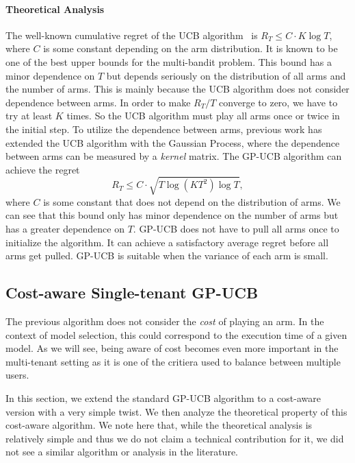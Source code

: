 \documentclass[letterpaper]{vldb}
\begin{document}
\vspace{-0.75em}
\paragraph*{Theoretical Analysis}

The well-known cumulative regret of the UCB algorithm~\cite{DBLP:journals/ftml/BubeckC12} is $R_T \leq C\cdot K\log T$,
where $C$ is some constant depending on the arm distribution. It is known to be one of the best upper bounds for the multi-bandit problem. This bound has a minor dependence on $T$ but depends seriously on the distribution of all arms and the number of arms. This is mainly because the UCB algorithm does not consider dependence between arms. In order to make $R_T/T$ converge to zero, we have to try at least $K$ times. So the UCB algorithm must play all arms once or twice in the initial step. To utilize the dependence between arms, previous work has extended the UCB algorithm with the Gaussian Process, where the dependence between arms can be measured by a \emph{kernel} matrix. The GP-UCB algorithm can achieve the regret
\[
R_T \leq C\cdot \sqrt{T\log(KT^2)\log T},
\]
where $C$ is some constant that does not depend on the distribution of arms. We can see that this bound only has minor dependence on the number of arms but has a greater dependence on $T$. GP-UCB does not have to pull all arms once to initialize the algorithm. It can achieve a satisfactory average regret before all arms get pulled. GP-UCB is suitable when the variance of each arm is small.



\vspace{-0.5em}
\subsection{Cost-aware Single-tenant GP-UCB}

The previous algorithm does not consider the {\em cost} of playing an arm.
In the context of model selection, this could correspond to the execution
time of a given model. 
As we will see, being aware of cost becomes even more important in the
multi-tenant setting as it is one of the critiera used to balance between
multiple users.

In this section, we extend the standard GP-UCB algorithm to a cost-aware version
with a very simple twist. We then analyze the theoretical property of
this cost-aware algorithm. We note here that, while the theoretical
analysis is relatively simple and thus we do not claim a technical contribution for
it, we did not see a similar algorithm or analysis in the literature.
\end{document}
